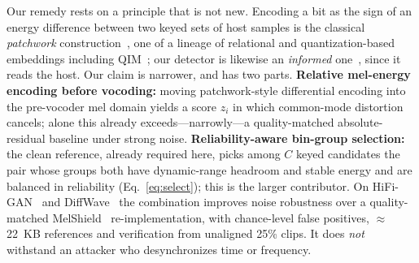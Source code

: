 Our remedy rests on a principle that is not new. Encoding a bit as the sign of an
energy difference between two keyed sets of host samples is the classical
\emph{patchwork} construction~\cite{bender1996,yeo2003}, one of a lineage of
relational and quantization-based embeddings including QIM~\cite{chen2001}; our
detector is likewise an \emph{informed} one~\cite{cox2008}, since it reads the host.
Our claim is narrower, and has two parts.
\textbf{Relative mel-energy encoding before vocoding:} moving patchwork-style
differential encoding into the pre-vocoder mel domain yields a score $z_i$ in which
common-mode distortion cancels; alone this already exceeds---narrowly---a
quality-matched absolute-residual baseline under strong noise.
\textbf{Reliability-aware bin-group selection:} the clean reference, already required
here, picks among $C$ keyed candidates the pair whose groups both have dynamic-range
headroom and stable energy and are balanced in reliability (Eq.~\eqref{eq:select});
this is the larger contributor. On HiFi-GAN~\cite{kong2020} and
DiffWave~\cite{kong2021} the combination improves noise robustness over a
quality-matched MelShield~\cite{jin2026} re-implementation, with chance-level false
positives, $\approx$\,22~KB references and verification from unaligned 25\% clips.
It does \emph{not} withstand an attacker who desynchronizes time or frequency.

